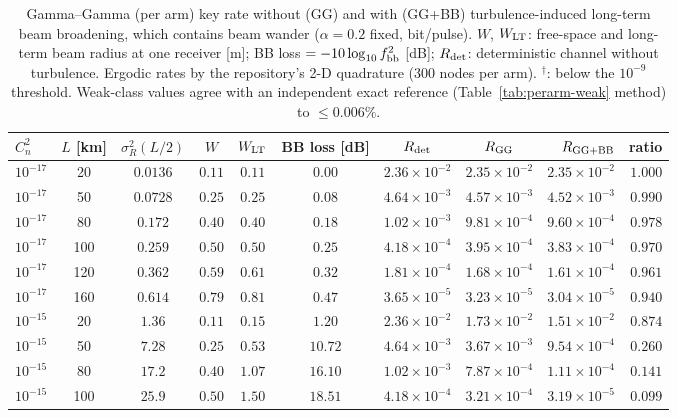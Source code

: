 \begin{table}[htbp]
\centering\scriptsize
\caption{Gamma--Gamma (per arm) key rate without (GG) and with (GG+BB) turbulence-induced long-term beam broadening, which contains beam wander ($\alpha=0.2$ fixed, bit/pulse). $W$, $W_{\rm LT}$: free-space and long-term beam radius at one receiver [m]; BB loss $=-10\log_{10}f_{\rm bb}^2$ [dB]; $R_{\rm det}$: deterministic channel without turbulence. Ergodic rates by the repository's 2-D quadrature (300 nodes per arm). $^{\dagger}$: below the $10^{-9}$ threshold. Weak-class values agree with an independent exact reference (Table~\ref{tab:perarm-weak} method) to $\le0.006\%$.}
\label{tab:bw-skr}
\begin{tabular}{lcccccccrr}
\toprule
$C_n^2$ & $L$ [km] & $\sigma_R^2(L/2)$ & $W$ & $W_{\rm LT}$ & BB loss [dB] & $R_{\rm det}$ & $R_{\rm GG}$ & $R_{\rm GG+BB}$ & ratio\\
\midrule
$10^{-17}$ & 20 & $0.0136$ & $0.11$ & $0.11$ & $0.00$ & $2.36\times10^{-2}$ & $2.35\times10^{-2}$ & $2.35\times10^{-2}$ & $1.000$ \\
$10^{-17}$ & 50 & $0.0728$ & $0.25$ & $0.25$ & $0.08$ & $4.64\times10^{-3}$ & $4.57\times10^{-3}$ & $4.52\times10^{-3}$ & $0.990$ \\
$10^{-17}$ & 80 & $0.172$ & $0.40$ & $0.40$ & $0.18$ & $1.02\times10^{-3}$ & $9.81\times10^{-4}$ & $9.60\times10^{-4}$ & $0.978$ \\
$10^{-17}$ & 100 & $0.259$ & $0.50$ & $0.50$ & $0.25$ & $4.18\times10^{-4}$ & $3.95\times10^{-4}$ & $3.83\times10^{-4}$ & $0.970$ \\
$10^{-17}$ & 120 & $0.362$ & $0.59$ & $0.61$ & $0.32$ & $1.81\times10^{-4}$ & $1.68\times10^{-4}$ & $1.61\times10^{-4}$ & $0.961$ \\
$10^{-17}$ & 160 & $0.614$ & $0.79$ & $0.81$ & $0.47$ & $3.65\times10^{-5}$ & $3.23\times10^{-5}$ & $3.04\times10^{-5}$ & $0.940$ \\
\midrule
$10^{-15}$ & 20 & $1.36$ & $0.11$ & $0.15$ & $1.20$ & $2.36\times10^{-2}$ & $1.73\times10^{-2}$ & $1.51\times10^{-2}$ & $0.874$ \\
$10^{-15}$ & 50 & $7.28$ & $0.25$ & $0.53$ & $10.72$ & $4.64\times10^{-3}$ & $3.67\times10^{-3}$ & $9.54\times10^{-4}$ & $0.260$ \\
$10^{-15}$ & 80 & $17.2$ & $0.40$ & $1.07$ & $16.10$ & $1.02\times10^{-3}$ & $7.87\times10^{-4}$ & $1.11\times10^{-4}$ & $0.141$ \\
$10^{-15}$ & 100 & $25.9$ & $0.50$ & $1.50$ & $18.51$ & $4.18\times10^{-4}$ & $3.21\times10^{-4}$ & $3.19\times10^{-5}$ & $0.099$ \\

\end{tabular}
\end{table}

